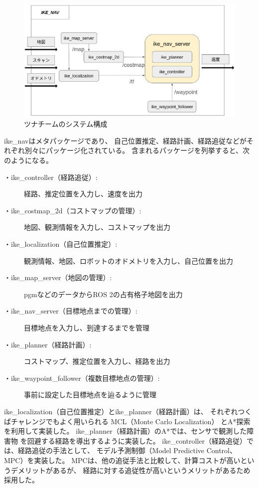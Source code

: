 \documentclass[twocolumn,9pt]{jsproceedings}
\begin{document}
\begin{figure}[h]
  \begin{center}
    \includegraphics[width=1.0\linewidth]{figs/ike_nav.pdf}
    \caption{ツナチームのシステム構成}
    \label{fig:tuna_system}
  \end{center}
\end{figure}

ike\_navはメタパッケージであり、
自己位置推定、経路計画、経路追従などがそれぞれ別々にパッケージ化されている。
含まれるパッケージを列挙すると、次のようになる。
\begin{description}
  \item[・ike\_controller（経路追従）:]経路、推定位置を入力し、速度を出力
  \item[・ike\_costmap\_2d（コストマップの管理）:]地図、観測情報を入力し、コストマップを出力
  \item[・ike\_localization（自己位置推定）:]観測情報、地図、ロボットのオドメトリを入力し、自己位置を出力
  \item[・ike\_map\_server（地図の管理）:]pgmなどのデータからROS 2の占有格子地図を出力
  \item[・ike\_nav\_server（目標地点までの管理）:]目標地点を入力し、到達するまでを管理
  \item[・ike\_planner（経路計画）:]コストマップ、推定位置を入力し、経路を出力
  \item[・ike\_waypoint\_follower（複数目標地点の管理）:]事前に設定した目標地点を辿るように管理
\end{description}

ike\_localization（自己位置推定）とike\_planner（経路計画）は、
それぞれつくばチャレンジでもよく用いられる
MCL（Monte Carlo Localization）\cite{fox1999etal}
とA*探索\cite{hart1968}を利用して実装した。
ike\_planner（経路計画）のA*では、センサで観測した障害物
を回避する経路を導出するように実装した。
ike\_controller（経路追従）では、経路追従の手法として、
モデル予測制御（Model Predictive Control、MPC）\cite{alberto2006}を実装した。
MPCは、他の追従手法と比較して、計算コストが高いというデメリットがあるが、
経路に対する追従性が高いというメリットがあるため採用した。
\end{document}
